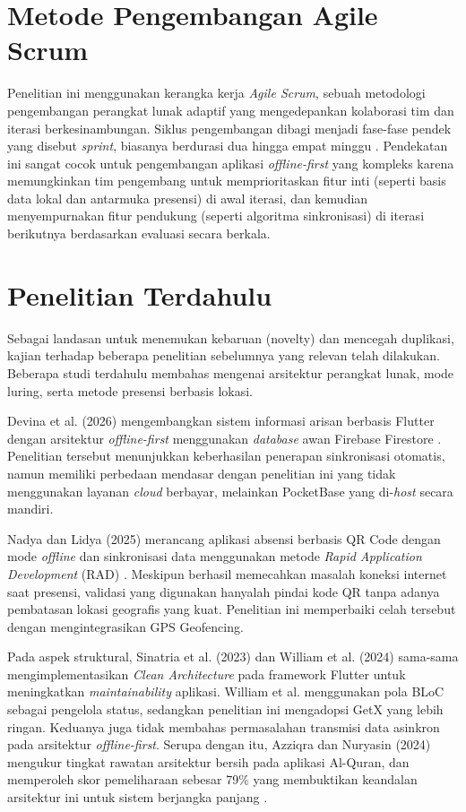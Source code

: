 \section{Metode Pengembangan Agile Scrum}
Penelitian ini menggunakan kerangka kerja \textit{Agile Scrum}, sebuah metodologi pengembangan perangkat lunak adaptif yang mengedepankan kolaborasi tim dan iterasi berkesinambungan. Siklus pengembangan dibagi menjadi fase-fase pendek yang disebut \textit{sprint}, biasanya berdurasi dua hingga empat minggu \cite{sinatria2023cleanarchitecture}. Pendekatan ini sangat cocok untuk pengembangan aplikasi \textit{offline-first} yang kompleks karena memungkinkan tim pengembang untuk memprioritaskan fitur inti (seperti basis data lokal dan antarmuka presensi) di awal iterasi, dan kemudian menyempurnakan fitur pendukung (seperti algoritma sinkronisasi) di iterasi berikutnya berdasarkan evaluasi secara berkala.

\section{Penelitian Terdahulu}
Sebagai landasan untuk menemukan kebaruan (novelty) dan mencegah duplikasi, kajian terhadap beberapa penelitian sebelumnya yang relevan telah dilakukan. Beberapa studi terdahulu membahas mengenai arsitektur perangkat lunak, mode luring, serta metode presensi berbasis lokasi.

Devina et al. (2026) mengembangkan sistem informasi arisan berbasis Flutter dengan arsitektur \textit{offline-first} menggunakan \textit{database} awan Firebase Firestore \cite{devina2026offlinefirst}. Penelitian tersebut menunjukkan keberhasilan penerapan sinkronisasi otomatis, namun memiliki perbedaan mendasar dengan penelitian ini yang tidak menggunakan layanan \textit{cloud} berbayar, melainkan PocketBase yang di-\textit{host} secara mandiri.

Nadya dan Lidya (2025) merancang aplikasi absensi berbasis QR Code dengan mode \textit{offline} dan sinkronisasi data menggunakan metode \textit{Rapid Application Development} (RAD) \cite{nadya2025offlineabsensi}. Meskipun berhasil memecahkan masalah koneksi internet saat presensi, validasi yang digunakan hanyalah pindai kode QR tanpa adanya pembatasan lokasi geografis yang kuat. Penelitian ini memperbaiki celah tersebut dengan mengintegrasikan GPS Geofencing.

Pada aspek struktural, Sinatria et al. (2023) \cite{sinatria2023cleanarchitecture} dan William et al. (2024) \cite{william2024cleanarchitecture} sama-sama mengimplementasikan \textit{Clean Architecture} pada framework Flutter untuk meningkatkan \textit{maintainability} aplikasi. William et al. menggunakan pola BLoC sebagai pengelola status, sedangkan penelitian ini mengadopsi GetX yang lebih ringan. Keduanya juga tidak membahas permasalahan transmisi data asinkron pada arsitektur \textit{offline-first}. Serupa dengan itu, Azziqra dan Nuryasin (2024) mengukur tingkat rawatan arsitektur bersih pada aplikasi Al-Quran, dan memperoleh skor pemeliharaan sebesar 79\% yang membuktikan keandalan arsitektur ini untuk sistem berjangka panjang \cite{azziqra2024cleanarchitecture}.


